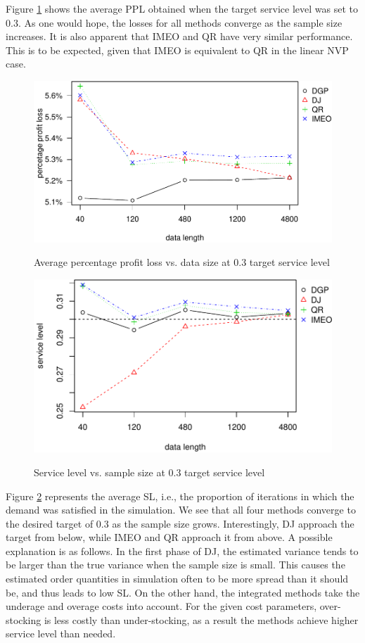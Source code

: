 \documentclass{article}
\begin{document}
 Figure \ref{fig:ppl0.3} shows the average PPL obtained when the target service level was set to $0.3$. As one would hope, the losses for all methods converge as the sample size increases. It is also apparent that IMEO and QR have very similar performance. This is to be expected, given that IMEO is equivalent to QR in the linear NVP case.

\begin{figure}[ht]
\centering
\caption{Average percentage profit loss vs. data size at 0.3 target service level}
\includegraphics{linear-norm-plot_files/figure-latex/ppl0.3-1.pdf}
\label{fig:ppl0.3}
\end{figure}

\begin{figure}[ht]
\centering
\caption{Service level vs. sample size at 0.3 target service level}
\includegraphics{linear-norm-plot_files/figure-latex/sl-3.pdf}
\label{fig:sl0.3}
\end{figure}

Figure \ref{fig:sl0.3} represents the average SL, i.e., the proportion of iterations in which the demand was satisfied in the simulation.
We see that all four methods converge to the desired target of 0.3 as the sample size grows. Interestingly, DJ approach the target from below, while IMEO and QR approach it from above. A possible explanation is as follows. In the first phase of DJ, the estimated variance tends to be larger than the true variance when the sample size is small. This causes the estimated order quantities in simulation often to be more spread than it should be, and thus leads to low SL. On the other hand, the integrated methods take the underage and overage costs into account. For the given cost parameters, over-stocking is less costly than under-stocking, as a result the methods achieve higher service level than needed.
\end{document}
